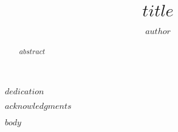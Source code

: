 \documentclass[twoside,12pt,final]{ucthesis-CA2012}
\begin{document}
\begin{ucfrontmatter}


  \title{$title$}

  \author{$author$}
   

	\maketitle
	\approvalpage


    \begin{dedication}

      \vspace*{25ex}

      \begin{center}
      \begin{Large}

        $dedication$

      \end{Large}

      \end{center}

  \end{dedication}
  \begin{acknowledgements}
    $acknowledgments$
  \end{acknowledgements}

  \begin{abstract}

    $abstract$

  \end{abstract}
	\tableofcontents
\end{ucfrontmatter}

\begin{ucmainmatter}

$body$

\end{ucmainmatter}
\end{document}
